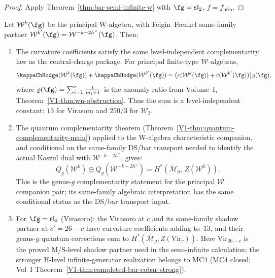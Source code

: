 \begin{proof}
Apply Theorem~\ref{thm:bar-semi-infinite-w} with
$\fg = \mathfrak{sl}_2$, $f = f_{\mathrm{prin}}$.
\end{proof}

\begin{corollary}
\label{cor:anomaly-duality-w}
Let $\mathcal{W}^k(\fg)$ be the principal W-algebra, with
Feigin--Frenkel same-family partner
$\mathcal{W}^{k'}(\fg) = \mathcal{W}^{-k-2h^\vee}(\fg)$.
Then:
\begin{enumerate}[label=\textup{(\alph*)}]
\item The curvature coefficients satisfy the same
level-independent complementarity law as the central-charge
package. For principal finite-type $\mathcal{W}$-algebras,
\[
\kappaChHodge(\mathcal{W}^k(\fg)) + \kappaChHodge(\mathcal{W}^{k'}(\fg))
= \bigl(c(\mathcal{W}^k(\fg)) + c(\mathcal{W}^{k'}(\fg))\bigr)
\varrho(\fg),
\]
where $\varrho(\fg) = \sum_{i=1}^r \frac{1}{m_i+1}$ is the anomaly
ratio from Volume~I, Theorem~\ref{V1-thm:wn-obstruction}. Thus the sum is a
level-independent constant: $13$ for Virasoro and $250/3$ for
$\mathcal{W}_3$.

\item The quantum complementarity theorem
\textup{(}Theorem~\textup{\ref{V1-thm:quantum-complementarity-main})}
applied to the W-algebra characteristic companion, and conditional on
the same-family DS/bar transport needed to identify the actual
Koszul dual with $\mathcal{W}^{-k-2h^\vee}$, gives:
\[
Q_g(\mathcal{W}^k) \oplus Q_g(\mathcal{W}^{-k-2h^\vee})
= H^*(\overline{\mathcal{M}}_g,\, Z(\mathcal{W}^k)).
\]
This is the genus-$g$ complementarity statement for the principal
$\mathcal{W}$ companion pair; its same-family algebraic
interpretation has the same conditional status as the DS/bar
transport input.

\item For $\fg = \mathfrak{sl}_2$
\textup{(}Virasoro\textup{)}: the Virasoro at
$c$ and its same-family shadow partner at $c' = 26 - c$ have
curvature coefficients adding to~$13$, and their
genus-$g$ quantum corrections sum to
 $H^*(\overline{\mathcal{M}}_g, Z(\mathrm{Vir}_c))$. Here
 $\mathrm{Vir}_{26-c}$ is the proved M/S-level shadow partner used in
 the semi-infinite calculation; the stronger H-level
 infinite-generator realization belongs to MC4
 (MC4 closed; Vol~I Theorem~\ref{V1-thm:completed-bar-cobar-strong}).
\end{enumerate}
\end{corollary}

